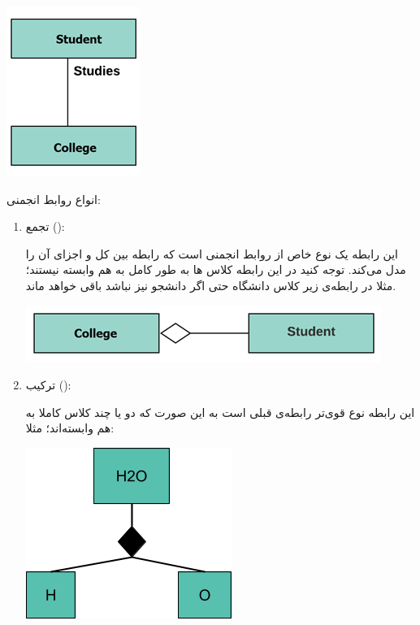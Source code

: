 \documentclass[]{article}
\begin{document}
\begin{itemize}[label=\textcolor{listColor}{$\blacklozenge$}]
\begin{itemize}[label=\textcolor{umlrelcolor}{$\blacksquare$}]
    \begin{center}

\includegraphics[]{images/image5.png}

\end{center}
 
 انواع روابط انجمنی: 
 
 \begin{enumerate}

\item
تجمع ():
 
 این رابطه یک نوع خاص از روابط انجمنی است که رابطه بین کل و اجزای آن را مدل می‌کند. توجه کنید در این رابطه کلاس ها به طور کامل به هم وابسته نیستند؛ مثلا 
در رابطه‌ی زیر کلاس دانشگاه حتی اگر دانشجو نیز نباشد باقی خواهد ماند.

\begin{center}


  \includegraphics[]{images/image9.png}
 



\end{center} 
 
 \newpage
 \item
ترکیب ():
 
این رابطه نوع قوی‌تر رابطه‌ی قبلی است به این صورت که دو یا چند کلاس کاملا به هم وابسته‌اند؛ مثلا:


\begin{center}


  \includegraphics[]{images/image13.png}
 




\end{center}
\end{enumerate}
\end{itemize}
\end{itemize}
\end{document}
